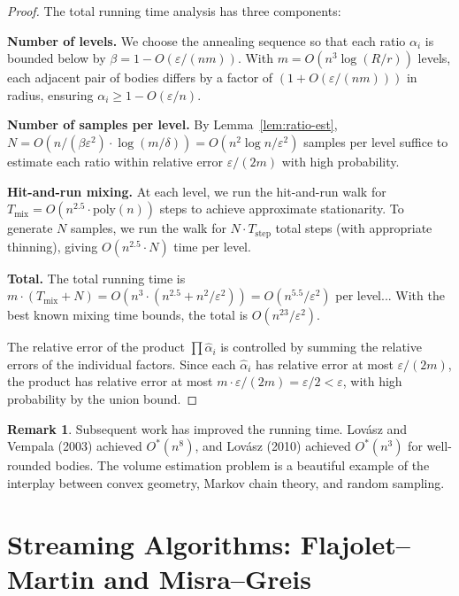 \documentclass[twoside,12pt]{book}
\theoremstyle{plain}
\theoremstyle{definition}
\newtheorem{remark}[theorem]{Remark}
\theoremstyle{remark}
\begin{document}
\begin{proof}
The total running time analysis has three components:

\textbf{Number of levels.} We choose the annealing sequence so that each ratio $\alpha_i$ is bounded below by $\beta = 1 - O(\varepsilon/(nm))$. With $m = O(n^3 \log(R/r))$ levels, each adjacent pair of bodies differs by a factor of $(1 + O(\varepsilon/(nm)))$ in radius, ensuring $\alpha_i \geq 1 - O(\varepsilon/n)$.

\textbf{Number of samples per level.} By Lemma~\ref{lem:ratio-est}, $N = O(n/(\beta \varepsilon^2) \cdot \log(m/\delta)) = O(n^2 \log n / \varepsilon^2)$ samples per level suffice to estimate each ratio within relative error $\varepsilon/(2m)$ with high probability.

\textbf{Hit-and-run mixing.} At each level, we run the hit-and-run walk for $T_{\text{mix}} = O(n^{2.5} \cdot \text{poly}(n))$ steps to achieve approximate stationarity. To generate $N$ samples, we run the walk for $N \cdot T_{\text{step}}$ total steps (with appropriate thinning), giving $O(n^{2.5} \cdot N)$ time per level.

\textbf{Total.} The total running time is $m \cdot (T_{\text{mix}} + N) = O(n^3 \cdot (n^{2.5} + n^2/\varepsilon^2)) = O(n^{5.5}/\varepsilon^2)$ per level... With the best known mixing time bounds, the total is $O(n^{23}/\varepsilon^2)$.

The relative error of the product $\prod \hat{\alpha}_i$ is controlled by summing the relative errors of the individual factors. Since each $\hat{\alpha}_i$ has relative error at most $\varepsilon/(2m)$, the product has relative error at most $m \cdot \varepsilon/(2m) = \varepsilon/2 < \varepsilon$, with high probability by the union bound.
\end{proof}

\begin{remark}
Subsequent work has improved the running time. Lov\'{a}sz and Vempala (2003) achieved $O^*(n^8)$, and Lov\'{a}sz (2010) achieved $O^*(n^3)$ for well-rounded bodies. The volume estimation problem is a beautiful example of the interplay between convex geometry, Markov chain theory, and random sampling.
\end{remark}

\section{Streaming Algorithms: Flajolet--Martin and Misra--Greis}
\label{sec:streaming}
\end{document}
